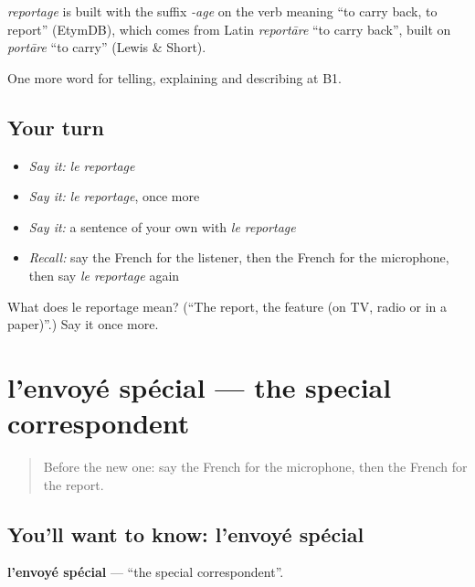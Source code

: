 \begin{cousinweb}
\emph{reportage} is built with the suffix \emph{-age} on the verb meaning \textquotedblleft{}to carry back, to report\textquotedblright{} (EtymDB), which comes from Latin \emph{reportāre} \textquotedblleft{}to carry back\textquotedblright{}, built on \emph{portāre} \textquotedblleft{}to carry\textquotedblright{} (Lewis \& Short).
\end{cousinweb}

\begin{grammarlens}[title={What you've built}]
One more word for telling, explaining and describing at B1.
\end{grammarlens}

\subsection*{Your turn}
\begin{itemize}
\raggedright
  \item \emph{Say it:} \emph{le reportage}
  \item \emph{Say it:} \emph{le reportage}, once more
  \item \emph{Say it:} a sentence of your own with \emph{le reportage}
  \item \emph{Recall:} say the French for the listener, then the French for the microphone, then say \emph{le reportage} again
\end{itemize}

\begin{tcolorbox}[breakable,colback=teal!4,colframe=teal!35!black,title={Before you move on}]
What does le reportage mean? (\textquotedblleft{}The report, the feature (on TV, radio or in a paper)\textquotedblright{}.) Say it once more.
\end{tcolorbox}
\section[l'envoyé spécial]{l'envoyé spécial — the special correspondent}

\label{lesson:FR-C281-envoye-special}



\begin{quote}
Before the new one: say the French for the microphone, then the French for the report.
\end{quote}

\subsection*{You'll want to know: l'envoyé spécial}
\textbf{l'envoyé spécial} — \textquotedblleft{}the special correspondent\textquotedblright{}.

